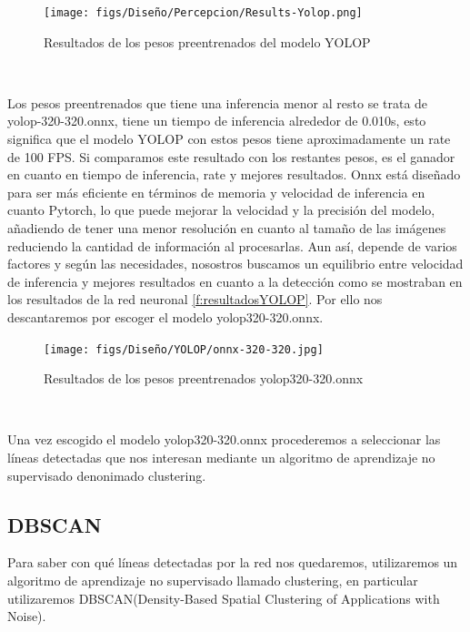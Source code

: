 \begin{figure} [H]
  \begin{center}
    \texttt{[image: figs/Diseño/Percepcion/Results-Yolop.png]}
  \end{center}
  \caption{Resultados de los pesos preentrenados del modelo YOLOP}
  \label{fig:resultados_pesos_preentrenados}
\end{figure}\

Los pesos preentrenados que tiene una inferencia menor al resto se trata de yolop-320-320.onnx, tiene un tiempo de inferencia alrededor de 0.010s, esto
significa que el modelo YOLOP con estos pesos tiene aproximadamente un rate de 100 FPS. Si comparamos este resultado con los restantes pesos, es el ganador en cuanto 
en tiempo de inferencia, rate y mejores resultados. 
Onnx está diseñado para ser más eficiente en términos de memoria y velocidad de inferencia en cuanto Pytorch, lo que puede mejorar la velocidad y la precisión
del modelo, añadiendo de tener una menor resolución en cuanto al tamaño de las imágenes reduciendo la cantidad de información al procesarlas. Aun así, depende de varios factores y según las necesidades, nosostros
buscamos un equilibrio entre velocidad de inferencia y mejores resultados en cuanto a la detección como se mostraban en los resultados de la red neuronal \ref{f:resultadosYOLOP}. 
Por ello nos descantaremos por escoger el modelo yolop320-320.onnx.\newline

\begin{figure} [H]
  \begin{center}
    \texttt{[image: figs/Diseño/YOLOP/onnx-320-320.jpg]}
  \end{center}
  \caption{Resultados de los pesos preentrenados yolop320-320.onnx}
  \label{fig:pesos_preentrenados}
\end{figure}\

Una vez escogido el modelo yolop320-320.onnx procederemos a seleccionar las líneas detectadas que nos interesan mediante un algoritmo de aprendizaje no supervisado denonimado clustering.

\subsection{DBSCAN}
\label{sec:DBSCAN}

Para saber con qué líneas detectadas por la red nos quedaremos, utilizaremos un algoritmo de aprendizaje no supervisado llamado clustering, en particular
utilizaremos DBSCAN(Density-Based Spatial Clustering of Applications with Noise)\cite{ski_dbs}.\newline

